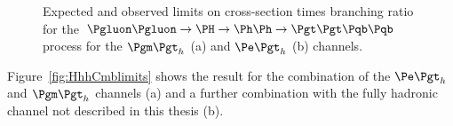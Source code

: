 \begin{figure}
\begin{center}

\end{center}
\caption{
Expected and observed limits on cross-section times branching ratio for the
$\Pgluon\Pgluon\to\PH\to\Ph\Ph\to\Pgt\Pgt\Pqb\Pqb$ process for the $\mutau$ (a) and
$\etau$ (b) channels.}
\label{fig:Hhhlimits}
\end{figure} 

Figure~\ref{fig:HhhCmblimits} shows the result for the combination of the
$\etau$ and $\mutau$ channels (a) and a further combination with the fully
hadronic channel not described in this thesis (b).

